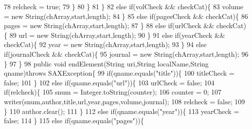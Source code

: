 \begin{DoxyCode}
78                                 relcheck = \textcolor{keyword}{true};
79                             \}
80                         \}
81                     \}
82                     \textcolor{keywordflow}{else} \textcolor{keywordflow}{if}(volCheck && checkCat)\{
83                         volume = \textcolor{keyword}{new} String(chArray,start,length);
84                     \}
85                     \textcolor{keywordflow}{else} \textcolor{keywordflow}{if}(pagesCheck && checkCat)\{
86                         pages = \textcolor{keyword}{new} String(chArray,start,length);
87                     \}
88                     \textcolor{keywordflow}{else} \textcolor{keywordflow}{if}(urlCheck && checkCat)\{
89                         url = \textcolor{keyword}{new} String(chArray,start,length);
90                     \}
91                     \textcolor{keywordflow}{else} \textcolor{keywordflow}{if}(yearCheck && checkCat)\{
92                         year = \textcolor{keyword}{new} String(chArray,start,length);
93                     \}
94                     \textcolor{keywordflow}{else} \textcolor{keywordflow}{if}(journalCheck && checkCat)\{
95                         journal = \textcolor{keyword}{new} String(chArray,start,length);
96                     \}
97                 \}
98                 \textcolor{keyword}{public} \textcolor{keywordtype}{void} endElement(String uri,String localName,String qname)\textcolor{keywordflow}{throws} SAXException\{
99                     \textcolor{keywordflow}{if}(qname.equals(\textcolor{stringliteral}{"title"}))\{
100                         titleCheck = \textcolor{keyword}{false};
101                     \}
102                     \textcolor{keywordflow}{else} \textcolor{keywordflow}{if}(qname.equals(\textcolor{stringliteral}{"url"}))\{
103                         urlCheck = \textcolor{keyword}{false};
104                         \textcolor{keywordflow}{if}(relcheck)\{
105                             snum = Integer.toString(counter);
106                             counter = 0;
107                             writer(snum,author,title,url,year,pages,volume,journal);
108                             relcheck = \textcolor{keyword}{false};
109                         \}
110                         author.clear();
111                     \}
112                     \textcolor{keywordflow}{else} \textcolor{keywordflow}{if}(qname.equals(\textcolor{stringliteral}{"year"}))\{
113                         yearCheck = \textcolor{keyword}{false};
114                     \}
115                     \textcolor{keywordflow}{else} \textcolor{keywordflow}{if}(qname.equals(\textcolor{stringliteral}{"pages"}))\{

\end{DoxyCode}
